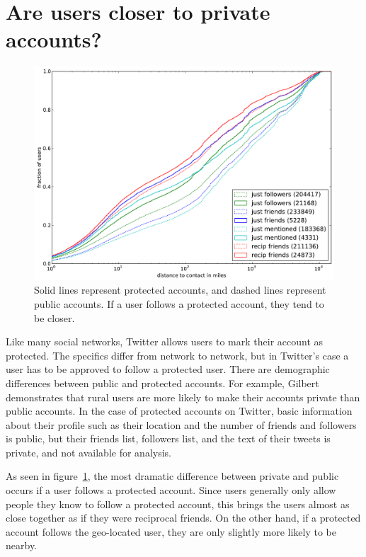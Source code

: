 \section{Are users closer to private accounts?}

\begin{figure}[tb]
\centering
\includegraphics[width=\linewidth]{figures/edge_types_prot.pdf}
\caption{Solid lines represent protected accounts, and dashed lines represent
public accounts. If a user follows a protected account, they tend to be
closer.}
\label{fig:EdgeTypesProt}
\end{figure}

Like many social networks, Twitter allows users to mark their account as
protected. The specifics differ from network to network, but in Twitter's case
a user has to be approved to follow a protected user.
There are demographic differences between public and protected accounts.
For example, Gilbert \cite{gilbert2008network} demonstrates that rural users
are more likely to make their accounts private than public accounts.
In the case of protected accounts on Twitter, basic information
about their profile such as their location and the number of friends and
followers is public, but their friends list, followers list, and the text of
their tweets is private, and not available for analysis.

As seen in figure~\ref{fig:EdgeTypesProt}, the most dramatic difference between
private and public occurs if a user follows a protected account.
%
Since users generally only allow people they know to follow a protected
account, this brings the users almost as close together as if they were
reciprocal friends.
%
On the other hand, if a protected account follows the geo-located user, they
are only slightly more likely to be nearby.

